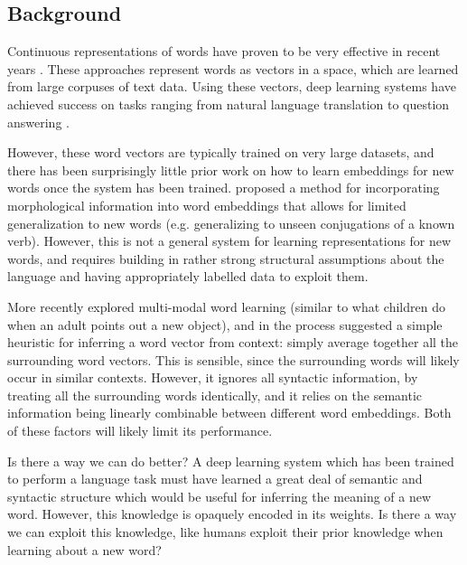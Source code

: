 \documentclass{article}
\begin{document}
\subsection{Background}
Continuous representations of words have proven to be very effective in recent years \cite[e.g.]{Mikolov2013, Pennington2014}. These approaches represent words as vectors in a space, which are learned from large corpuses of text data. Using these vectors, deep learning systems have achieved success on tasks ranging from natural language translation \cite[e.g.]{Wu2016} to question answering \cite[e.g.]{Santoro2017}. \par
However, these word vectors are typically trained on very large datasets, and there has been surprisingly little prior work on how to learn embeddings for new words once the system has been trained. \citet{Cotterell2016} proposed a method for incorporating morphological information into word embeddings that allows for limited generalization to new words (e.g. generalizing to unseen conjugations of a known verb). However, this is not a general system for learning representations for new words, and requires building in rather strong structural assumptions about the language and having appropriately labelled data to exploit them. \par
More recently \citet{Lazaridou2017} explored multi-modal word learning (similar to what children do when an adult points out a new object), and in the process suggested a simple heuristic for inferring a word vector from context: simply average together all the surrounding word vectors. This is sensible, since the surrounding words will likely occur in similar contexts. However, it ignores all syntactic information, by treating all the surrounding words identically, and it relies on the semantic information being linearly combinable between different word embeddings. Both of these factors will likely limit its performance. \par
Is there a way we can do better? A deep learning system which has been trained to perform a language task must have learned a great deal of semantic and syntactic structure which would be useful for inferring the meaning of a new word. However, this knowledge is opaquely encoded in its weights. Is there a way we can exploit this knowledge, like humans exploit their prior knowledge when learning about a new word? \par
\end{document}
